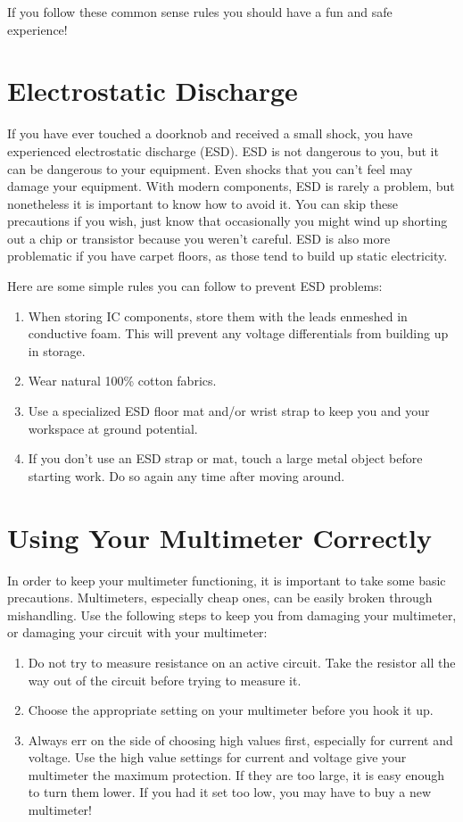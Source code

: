 If you follow these common sense rules you should have a fun and safe experience!

\section{Electrostatic Discharge}

If you have ever touched a doorknob and received a small shock, you have experienced electrostatic discharge (ESD).  
ESD is not dangerous to you, but it can be dangerous to your equipment.  
Even shocks that you can't feel may damage your equipment.  
With modern components, ESD is rarely a problem, but nonetheless it is important to know how to avoid it.  
You can skip these precautions if you wish, just know that occasionally you might wind up shorting out a chip or transistor because you weren't careful.  
ESD is also more problematic if you have carpet floors, as those tend to build up static electricity.

Here are some simple rules you can follow to prevent ESD problems:

\begin{enumerate}
\item When storing IC components, store them with the leads enmeshed in conductive foam.  This will prevent any voltage differentials from building up in storage.
\item Wear natural 100\% cotton fabrics.
\item Use a specialized ESD floor mat and/or wrist strap to keep you and your workspace at ground potential.
\item If you don't use an ESD strap or mat, touch a large metal object before starting work.  Do so again any time after moving around.
\end{enumerate}

\section{Using Your Multimeter Correctly}
In order to keep your multimeter functioning, it is important to take some basic precautions.  Multimeters, especially cheap ones, can be easily broken through mishandling.  Use the following steps to keep you from damaging your multimeter, or damaging your circuit with your multimeter:

\begin{enumerate}
\item Do not try to measure resistance on an active circuit.  Take the resistor all the way out of the circuit before trying to measure it.
\item Choose the appropriate setting on your multimeter before you hook it up.
\item Always err on the side of choosing high values first, especially for current and voltage.  Use the high value settings for current and voltage give your multimeter the maximum protection.  If they are too large, it is easy enough to turn them lower.  If you had it set too low, you may have to buy a new multimeter!
\end{enumerate}

